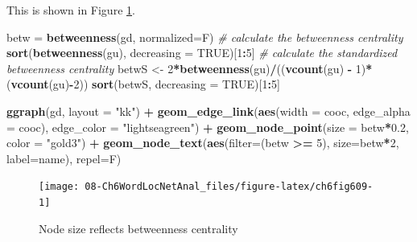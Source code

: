 \documentclass[
]{article}
\newenvironment{Shaded}{\begin{snugshade}}{\end{snugshade}}
\newcommand{\AttributeTok}[1]{\textcolor[rgb]{0.13,0.29,0.53}{#1}}
\newcommand{\CommentTok}[1]{\textcolor[rgb]{0.56,0.35,0.01}{\textit{#1}}}
\newcommand{\ConstantTok}[1]{\textcolor[rgb]{0.56,0.35,0.01}{#1}}
\newcommand{\DecValTok}[1]{\textcolor[rgb]{0.00,0.00,0.81}{#1}}
\newcommand{\FloatTok}[1]{\textcolor[rgb]{0.00,0.00,0.81}{#1}}
\newcommand{\FunctionTok}[1]{\textcolor[rgb]{0.13,0.29,0.53}{\textbf{#1}}}
\newcommand{\NormalTok}[1]{#1}
\newcommand{\OtherTok}[1]{\textcolor[rgb]{0.56,0.35,0.01}{#1}}
\newcommand{\SpecialCharTok}[1]{\textcolor[rgb]{0.81,0.36,0.00}{\textbf{#1}}}
\newcommand{\StringTok}[1]{\textcolor[rgb]{0.31,0.60,0.02}{#1}}
\begin{document}
This is shown in Figure \ref{fig:ch6fig609}.

\begin{Shaded}
\begin{Highlighting}[]
\NormalTok{betw }\OtherTok{=} \FunctionTok{betweenness}\NormalTok{(gd, }\AttributeTok{normalized=}\NormalTok{F)}
\CommentTok{\# calculate the betweenness centrality}
\FunctionTok{sort}\NormalTok{(}\FunctionTok{betweenness}\NormalTok{(gu), }\AttributeTok{decreasing =} \ConstantTok{TRUE}\NormalTok{)[}\DecValTok{1}\SpecialCharTok{:}\DecValTok{5}\NormalTok{]}
\CommentTok{\# calculate the standardized betweenness centrality}
\NormalTok{betwS }\OtherTok{\textless{}{-}} \DecValTok{2}\SpecialCharTok{*}\FunctionTok{betweenness}\NormalTok{(gu)}\SpecialCharTok{/}\NormalTok{((}\FunctionTok{vcount}\NormalTok{(gu) }\SpecialCharTok{{-}} \DecValTok{1}\NormalTok{)}\SpecialCharTok{*}\NormalTok{(}\FunctionTok{vcount}\NormalTok{(gu)}\SpecialCharTok{{-}}\DecValTok{2}\NormalTok{))}
\FunctionTok{sort}\NormalTok{(betwS, }\AttributeTok{decreasing =} \ConstantTok{TRUE}\NormalTok{)[}\DecValTok{1}\SpecialCharTok{:}\DecValTok{5}\NormalTok{]}

\FunctionTok{ggraph}\NormalTok{(gd, }\AttributeTok{layout =} \StringTok{"kk"}\NormalTok{) }\SpecialCharTok{+}
  \FunctionTok{geom\_edge\_link}\NormalTok{(}\FunctionTok{aes}\NormalTok{(}\AttributeTok{width =}\NormalTok{ cooc, }\AttributeTok{edge\_alpha =}\NormalTok{ cooc), }
     \AttributeTok{edge\_color =} \StringTok{"lightseagreen"}\NormalTok{) }\SpecialCharTok{+}
  \FunctionTok{geom\_node\_point}\NormalTok{(}\AttributeTok{size =}\NormalTok{ betw}\SpecialCharTok{*}\FloatTok{0.2}\NormalTok{, }\AttributeTok{color =} \StringTok{"gold3"}\NormalTok{) }\SpecialCharTok{+}
  \FunctionTok{geom\_node\_text}\NormalTok{(}\FunctionTok{aes}\NormalTok{(}\AttributeTok{filter=}\NormalTok{(betw }\SpecialCharTok{\textgreater{}=} \DecValTok{5}\NormalTok{), }\AttributeTok{size=}\NormalTok{betw}\SpecialCharTok{*}\DecValTok{2}\NormalTok{, }\AttributeTok{label=}\NormalTok{name), }\AttributeTok{repel=}\NormalTok{F)}
\end{Highlighting}
\end{Shaded}

\begin{figure}

{\centering \texttt{[image: 08-Ch6WordLocNetAnal\_files/figure-latex/ch6fig609-1]} 

}

\caption{Node size reflects betweenness centrality}\label{fig:ch6fig609}
\end{figure}
\end{document}
